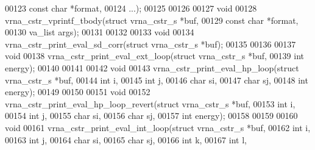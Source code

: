 \begin{DoxyCode}
00123                        \textcolor{keyword}{const} \textcolor{keywordtype}{char}         *format,
00124                        ...);
00125 
00126 
00127 \textcolor{keywordtype}{void}
00128 vrna\_cstr\_vprintf\_tbody(\textcolor{keyword}{struct} vrna\_cstr\_s  *buf,
00129                         \textcolor{keyword}{const} \textcolor{keywordtype}{char}          *format,
00130                         va\_list             args);
00131 
00132 
00133 \textcolor{keywordtype}{void}
00134 vrna\_cstr\_print\_eval\_sd\_corr(\textcolor{keyword}{struct} vrna\_cstr\_s *buf);
00135 
00136 
00137 \textcolor{keywordtype}{void}
00138 vrna\_cstr\_print\_eval\_ext\_loop(\textcolor{keyword}{struct} vrna\_cstr\_s  *buf,
00139                               \textcolor{keywordtype}{int}                 energy);
00140 
00141 
00142 \textcolor{keywordtype}{void}
00143 vrna\_cstr\_print\_eval\_hp\_loop(\textcolor{keyword}{struct} vrna\_cstr\_s *buf,
00144                              \textcolor{keywordtype}{int}                i,
00145                              \textcolor{keywordtype}{int}                j,
00146                              \textcolor{keywordtype}{char}               si,
00147                              \textcolor{keywordtype}{char}               sj,
00148                              \textcolor{keywordtype}{int}                energy);
00149 
00150 
00151 \textcolor{keywordtype}{void}
00152 vrna\_cstr\_print\_eval\_hp\_loop\_revert(\textcolor{keyword}{struct} vrna\_cstr\_s  *buf,
00153                                     \textcolor{keywordtype}{int}                 i,
00154                                     \textcolor{keywordtype}{int}                 j,
00155                                     \textcolor{keywordtype}{char}                si,
00156                                     \textcolor{keywordtype}{char}                sj,
00157                                     \textcolor{keywordtype}{int}                 energy);
00158 
00159 
00160 \textcolor{keywordtype}{void}
00161 vrna\_cstr\_print\_eval\_int\_loop(\textcolor{keyword}{struct} vrna\_cstr\_s  *buf,
00162                               \textcolor{keywordtype}{int}                 i,
00163                               \textcolor{keywordtype}{int}                 j,
00164                               \textcolor{keywordtype}{char}                si,
00165                               \textcolor{keywordtype}{char}                sj,
00166                               \textcolor{keywordtype}{int}                 k,
00167                               \textcolor{keywordtype}{int}                 l,

\end{DoxyCode}
